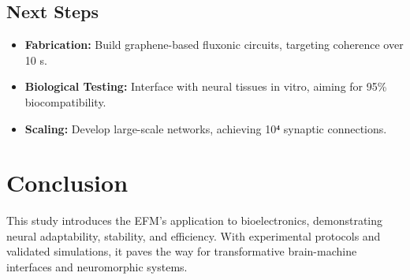 \documentclass{article}
\begin{document}
\subsection{Next Steps}
\begin{itemize}
    \item \textbf{Fabrication:} Build graphene-based fluxonic circuits, targeting coherence over 10 s.
    \item \textbf{Biological Testing:} Interface with neural tissues in vitro, aiming for 95\% biocompatibility.
    \item \textbf{Scaling:} Develop large-scale networks, achieving 10⁴ synaptic connections.
\end{itemize}

\section{Conclusion}
This study introduces the EFM’s application to bioelectronics, demonstrating neural adaptability, stability, and efficiency. With experimental protocols and validated simulations, it paves the way for transformative brain-machine interfaces and neuromorphic systems.
\end{document}

